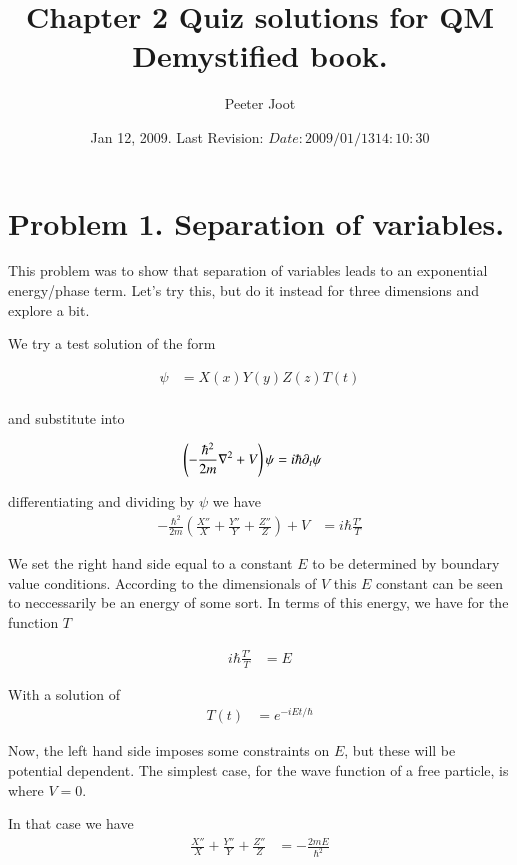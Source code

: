 \documentclass{article}
\title{ Chapter 2 Quiz solutions for QM Demystified book. }
\author{Peeter Joot}
\date{ Jan 12, 2009.  Last Revision: $Date: 2009/01/13 14:10:30 $ }
\begin{document}
\maketitle{}

\section{ Problem 1. Separation of variables. }

This problem was to show that separation of variables leads to an exponential energy/phase
term.  Let's try this, but do it instead for three dimensions and explore a bit.

We try a test solution of the form

\begin{align*}
\psi &= X(x) Y(y) Z(z) T(t) \\
\end{align*}

and substitute into 

\begin{align*}
\left(-\frac{\hbar^2}{2m}\nabla^2 + V\right) \psi &= i \hbar \partial_t \psi
\end{align*}

differentiating and dividing by $\psi$ we have
\begin{align*}
-\frac{\hbar^2}{2m}
\left(
\frac{X''}{X}
+\frac{Y''}{Y}
+\frac{Z''}{Z}
\right)
 + V &= i \hbar \frac{T'}{T}
\end{align*}

We set the right hand side equal to a constant $E$ to be determined by boundary value conditions.
According to the dimensionals of $V$ this $E$ constant can be seen to neccessarily be an energy
of some sort.  In terms of this energy, we have for the function $T$

\begin{align*}
i \hbar \frac{T'}{T} &= E
\end{align*}

With a solution of
\begin{align*}
T(t) &= e^{-i E t/\hbar}
\end{align*}

Now, the left hand side imposes some constraints on $E$, but these will be potential dependent.
The simplest case, for the wave function of a free particle, is where $V=0$.

In that case we have
\begin{align*}
\frac{X''}{X} +\frac{Y''}{Y} +\frac{Z''}{Z} &= - \frac{2 m E}{\hbar^2}
\end{align*}
\end{document}

